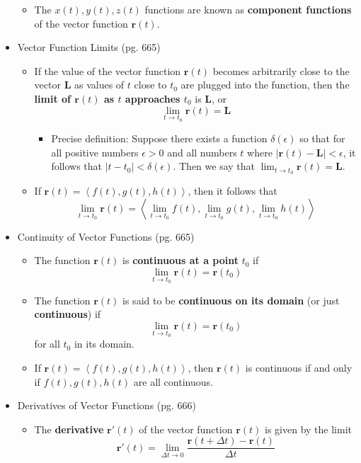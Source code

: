 \documentclass[12pt]{article}
\theoremstyle{plain}
\theoremstyle{definition}
\theoremstyle{remark}
\newcommand{\vect}[1]{\mathbf{#1}}
\begin{document}
\begin{itemize}
\begin{itemize}
		\item The $x(t),y(t),z(t)$ functions are known as \textbf{component functions} of the vector function $\vect{r}(t)$.
		\end{itemize}
	\item Vector Function Limits (pg. 665)
		\begin{itemize}
		\item If the value of the vector function $\vect{r}(t)$ becomes arbitrarily close to the vector $\vect{L}$ as values of $t$ close to $t_0$ are plugged into the function, then the \textbf{limit of $\vect{r}(t)$ as $t$ approaches $t_0$} is $\vect{L}$, or \[\lim_{t\to t_0} \vect{r}(t) = \vect{L}\]
			\begin{itemize}
			\item Precise definition: \newline
			Suppose there exists a function $\delta(\epsilon)$ so that for all positive numbers $\epsilon>0$ and all numbers $t$ where $|\vect{r}(t)-\vect{L}|<\epsilon$, it follows that $|t-t_0|<\delta(\epsilon)$. Then we say that $\lim_{t\to t_0} \vect{r}(t) = \vect{L}$.
			\end{itemize}
		\item If $\vect{r}(t) = \left<f(t),g(t),h(t)\right>$, then it follows that \[\lim_{t\to t_0} \vect{r}(t) = \left<\lim_{t\to t_0} f(t), \lim_{t\to t_0} g(t), \lim_{t\to t_0} h(t)\right>\]
		\end{itemize}
	\newpage
	\item Continuity of Vector Functions (pg. 665)
		\begin{itemize}
		\item The function $\vect{r}(t)$ is \textbf{continuous at a point} $t_0$ if \[\lim_{t\to t_0}\vect{r}(t) = \vect{r}(t_0)\]
		\item
		The function $\vect{r}(t)$ is said to be \textbf{continuous on its domain} (or just \textbf{continuous}) if \[\lim_{t\to t_0}\vect{r}(t) = \vect{r}(t_0)\] for all $t_0$ in its domain.
		\item If $\vect{r}(t) = \left<f(t),g(t),h(t)\right>$, then $\vect{r}(t)$ is continuous if and only if $f(t),g(t),h(t)$ are all continuous.
		\end{itemize}
	\item Derivatives of Vector Functions (pg. 666)
		\begin{itemize}
		\item The \textbf{derivative} $\vect{r}'(t)$ of the vector function $\vect{r}(t)$ is given by the limit \[\vect{r}'(t) = \lim_{\Delta t \to 0} \frac{\vect{r}(t+\Delta t) - \vect{r}(t)}{\Delta t}\]
		

\end{itemize}
\end{itemize}
\end{document}
